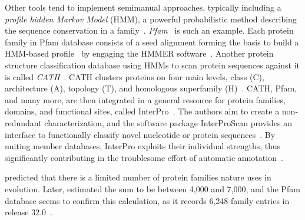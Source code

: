   Other tools tend to implement semimanual approaches, typically including a
  \emph{profile hidden Markov Model} (HMM), a powerful probabilistic method describing the
  sequence conservation in a family~\cite{krogh1994hidden, eddy1996hidden}.
  \emph{Pfam}~\cite{sonnhammer1997pfam} is such an example.
  Each protein family in Pfam database consists of a seed alignment forming the basis to
  build a HMM-based profile~\cite{el2019pfam} by engaging the HMMER
  software~\cite{finn2010pfam, finn2011hmmer}.
  Another protein structure classification database using HMMs to scan protein sequences
  against it is called \emph{CATH}~\cite{dawson2017cath}.
  CATH clusters proteins on four main levels, class (C), architecture (A), topology (T),
  and homologous superfamily (H)~\cite{orengo1997cath}.
  CATH, Pfam, and many more, are then integrated in a general resource for protein
  families, domains, and functional sites, called InterPro~\cite{finn2017interpro}.
  The authors aim to create a non-redundant characterization, and the software package
  InterProScan provides an interface to functionally classify novel nucleotide or protein
  sequences~\cite{zdobnov2001interproscan}.
  By uniting member databases, InterPro exploits their individual strengths, thus
  significantly contributing in the troublesome effort of automatic
  annotation~\cite{apweiler2000interpro}.

  \citet{chothia1992one} predicted that there is a limited number of protein families
  nature uses in evolution.
  Later, \citet{wolf2000estimating} estimated the sum to be between 4,000 and 7,000, and
  the Pfam database seems to confirm this calculation, as it records 6,248 family entries
  in release 32.0~\cite{el2019pfam}.

\label{intro:pkinase}


